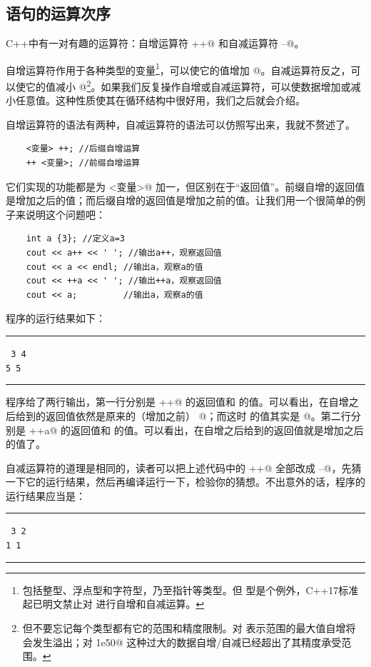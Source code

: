 \subsection*{语句的运算次序}
C++中有一对有趣的运算符：自增运算符 \lstinline@++@ 和自减运算符 \lstinline@--@。\par
自增运算符作用于各种类型的变量\footnote{包括整型、浮点型和字符型，乃至指针等类型。但 \lstinline@bool@ 型是个例外，C++17标准起已明文禁止对 \lstinline@bool@ 进行自增和自减运算。}，可以使它的值增加 @。自减运算符反之，可以使它的值减小 @\footnote{但不要忘记每个类型都有它的范围和精度限制。对 \lstinline@int@ 表示范围的最大值自增将会发生溢出；对 \lstinline@1e50@ 这种过大的数据自增/自减已经超出了其精度承受范围。}。如果我们反复操作自增或自减运算符，可以使数据增加或减小任意值。这种性质使其在循环结构中很好用，我们之后就会介绍。\par
自增运算符的语法有两种，自减运算符的语法可以仿照写出来，我就不赘述了。
\begin{lstlisting}
    <变量> ++; //后缀自增运算
    ++ <变量>; //前缀自增运算
\end{lstlisting}
它们实现的功能都是为 \lstinline@<变量>@ 加一，但区别在于``返回值''。前缀自增的返回值是增加之后的值；而后缀自增的返回值是增加之前的值。让我们用一个很简单的例子来说明这个问题吧：
\begin{lstlisting}
    int a {3}; //定义a=3
    cout << a++ << ' '; //输出a++，观察返回值
    cout << a << endl; //输出a，观察a的值
    cout << ++a << ' '; //输出++a，观察返回值
    cout << a;         //输出a，观察a的值
\end{lstlisting}
程序的运行结果如下：\\\noindent\rule{\linewidth}{0.2pt}\texttt{
3 4\\
5 5
}\\\noindent\rule{\linewidth}{0.2pt}\par
程序给了两行输出，第一行分别是 \lstinline@a++@ 的返回值和 \lstinline@a@ 的值。可以看出，\lstinline@a@ 在自增之后给到的返回值依然是原来的（增加之前） @；而这时 \lstinline@a@ 的值其实是 @。第二行分别是 \lstinline@++a@ 的返回值和 \lstinline@a@ 的值。可以看出，\lstinline@a@ 在自增之后给到的返回值就是增加之后的值了。\par
自减运算符的道理是相同的，读者可以把上述代码中的 \lstinline@++@ 全部改成 \lstinline@--@，先猜一下它的运行结果，然后再编译运行一下，检验你的猜想。不出意外的话，程序的运行结果应当是：\\\noindent\rule{\linewidth}{0.2pt}\texttt{
3 2\\
1 1
}\\\noindent\rule{\linewidth}{0.2pt}\par
